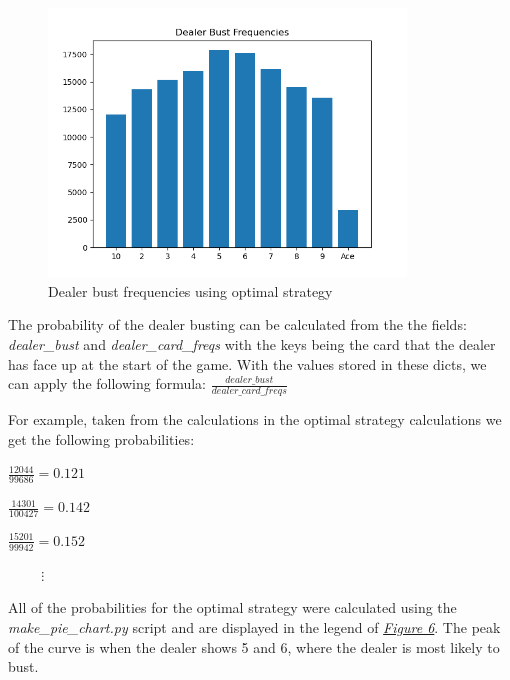 \documentclass{article}
\begin{document}
{		\begin{figure}[H]
			\hypertarget{fig5}{}
			\begin{center}
				\includegraphics[width=9.5cm]{bust-data-optimal.png}
				\caption{Dealer bust frequencies using optimal strategy}
			\end{center}
		\end{figure}

		The probability of the dealer busting can be calculated from the the fields: \textit{dealer\_bust} and 
		\textit{dealer\_card\_freqs} with the keys being the card that 
		the dealer has face up at the start of the game. With the values stored in these dicts, we can apply the following formula:
		$\frac{dealer\_bust}{dealer\_card\_freqs}$ 

		For example, taken from the calculations in the optimal strategy calculations we get the following probabilities:

		$\frac{12044}{99686} = 0.121$

		$\frac{14301}{100427} = 0.142$

		$\frac{15201}{99942} = 0.152$

		$\hspace{1cm}\vdots$

		All of the probabilities for the optimal strategy were calculated using the \textit{make\_pie\_chart.py} script and are displayed in
		the legend of \hyperlink{fig6}{\textit{Figure 6}}. The peak of the curve is when the dealer shows 5 and 6, where the dealer is most likely
		to bust.

}
\end{document}
